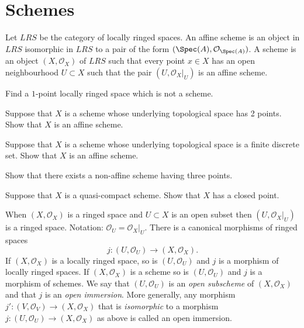 \section{Schemes}
\label{section-schemes}

\noindent
Let $LRS$ be the category of locally ringed spaces.
An affine scheme is an object in $LRS$ isomorphic in $LRS$ to
a pair of the form $(\Spec(A), {\mathcal O}_{\Spec(A)})$.
A scheme is an
object $(X, {\mathcal O}_X)$ of $LRS$ such that every point $x\in X$
has an open neighbourhood $U \subset X$ such that the pair
$(U, {\mathcal O}_X|_U)$ is an affine scheme.

\begin{exercise}
\label{exercise-one-point}
Find a $1$-point locally ringed space which is not a scheme.
\end{exercise}

\begin{exercise}
\label{exercise-two-points}
Suppose that $X$ is a scheme whose underlying
topological space has 2 points. Show that $X$ is an affine scheme.
\end{exercise}

\begin{exercise}
\label{exercise-discrete-finite-set-points}
Suppose that $X$ is a scheme whose underlying topological space is a
finite discrete set. Show that $X$ is an affine scheme.
\end{exercise}

\begin{exercise}
\label{exercise-three-points}
Show that there exists a non-affine scheme having three points.
\end{exercise}

\begin{exercise}
\label{exercise-quasi-compact-closed-point}
Suppose that $X$ is a quasi-compact scheme.
Show that $X$ has a closed point.
\end{exercise}

\begin{remark}
\label{remark-open-immersion}
When $(X, {\mathcal O}_X)$ is a ringed space and $U \subset X$
is an open subset then $(U, {\mathcal O}_X|_U)$ is a ringed space. Notation:
${\mathcal O}_U = {\mathcal O}_X|_U$. There is a canonical morphisms
of ringed spaces
$$
j : (U, {\mathcal O}_U) \longrightarrow (X, {\mathcal O}_X).
$$
If $(X, {\mathcal O}_X)$ is a locally ringed space, so is
$(U, {\mathcal O}_U)$ and
$j$ is a morphism of locally ringed spaces. If $(X, {\mathcal O}_X)$
is a scheme
so is $(U, {\mathcal O}_U)$ and $j$ is a morphism of schemes. We say
that
$(U, {\mathcal O}_U)$ is an {\it open subscheme} of $(X, {\mathcal O}_X)$
and that
$j$ is an {\it open immersion}. More generally, any morphism
$j' : (V, {\mathcal O}_V) \to (X, {\mathcal O}_X)$ that is {\it isomorphic}
to a
morphism $j : (U, {\mathcal O}_U) \to (X, {\mathcal O}_X)$ as above is
called an
open immersion.
\end{remark}

